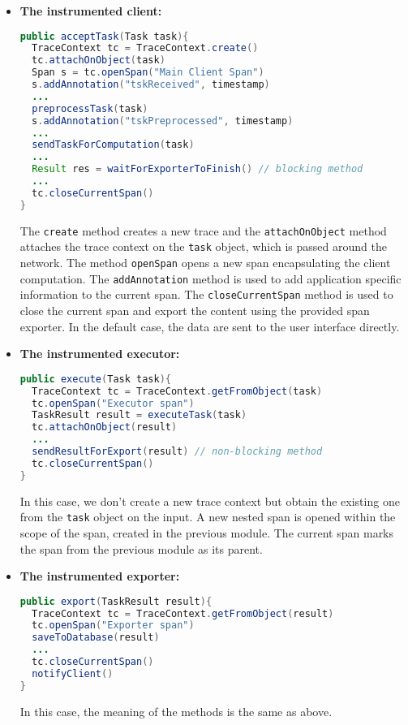 \begin{itemize}
\item \textbf{The instrumented client:}
\begin{lstlisting}[language=Java]
public acceptTask(Task task){
  TraceContext tc = TraceContext.create()
  tc.attachOnObject(task)
  Span s = tc.openSpan("Main Client Span")	
  s.addAnnotation("tskReceived", timestamp)
  ...
  preprocessTask(task)
  s.addAnnotation("tskPreprocessed", timestamp)
  ...
  sendTaskForComputation(task)
  ...
  Result res = waitForExporterToFinish() // blocking method
  ...
  tc.closeCurrentSpan()
}
\end{lstlisting}
The \texttt{create} method creates a new trace and the \texttt{attachOnObject} method attaches the trace context on the \texttt{task} object, which is passed around the network. The method \texttt{openSpan} opens a new span encapsulating the client computation. The \texttt{addAnnotation} method is used to add application specific information to the current span. The \texttt{closeCurrentSpan} method is used to close the current span and export the content using the provided span exporter. In the default case, the data are sent to the user interface directly.


\item \textbf{The instrumented executor:}
\begin{lstlisting}[language=Java]
public execute(Task task){
  TraceContext tc = TraceContext.getFromObject(task)
  tc.openSpan("Executor span")
  TaskResult result = executeTask(task)
  tc.attachOnObject(result)
  ...
  sendResultForExport(result) // non-blocking method
  tc.closeCurrentSpan()
}
\end{lstlisting}
In this case, we don't create a new trace context but obtain the existing one from the \texttt{task} object on the input. A new nested span is opened within the scope of the span, created in the previous module. The current span marks the span from the previous module as its parent.

\item \textbf{The instrumented exporter:}
\begin{lstlisting}[language=Java]
public export(TaskResult result){
  TraceContext tc = TraceContext.getFromObject(result)
  tc.openSpan("Exporter span")
  saveToDatabase(result)
  ...
  tc.closeCurrentSpan()
  notifyClient()	
}
\end{lstlisting}
In this case, the meaning of the methods is the same as above.

\end{itemize}

